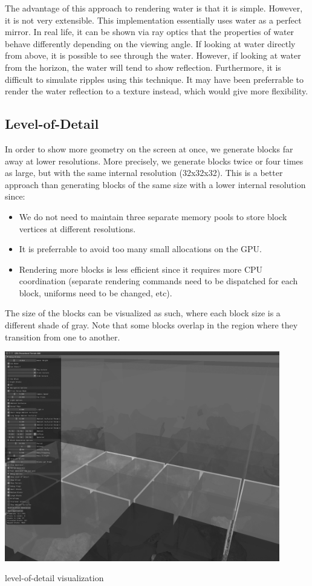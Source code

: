 \documentclass {article}
\begin{document}
The advantage of this approach to rendering water is that it is simple. However, it is not very extensible. This implementation essentially uses water as a perfect mirror. In real life, it can be shown via ray optics that the properties of water behave differently depending on the viewing angle. If looking at water directly from above, it is possible to see through the water. However, if looking at water from the horizon, the water will tend to show reflection. Furthermore, it is difficult to simulate ripples using this technique. It may have been preferrable to render the water reflection to a texture instead, which would give more flexibility.

\subsection{Level-of-Detail}

In order to show more geometry on the screen at once, we generate blocks far away at lower resolutions. More precisely, we generate blocks twice or four times as large, but with the same internal resolution (32x32x32). This is a better approach than generating blocks of the same size with a lower internal resolution since:

\begin{itemize}
\item We do not need to maintain three separate memory pools to store block vertices at different resolutions.
\item It is preferrable to avoid too many small allocations on the GPU.
\item Rendering more blocks is less efficient since it requires more CPU coordination (separate rendering commands need to be dispatched for each block, uniforms need to be changed, etc).
\end{itemize}

The size of the blocks can be visualized as such, where each block size is a different shade of gray. Note that some blocks overlap in the region where they transition from one to another.

\begin{center}
    \includegraphics[width=12cm]{lod.png}

    level-of-detail visualization
\end{center}
\end{document}
